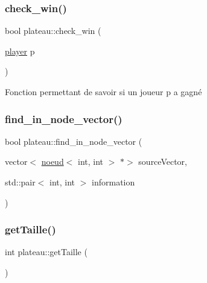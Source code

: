 \subsubsection{\texorpdfstring{check\+\_\+win()}{check\_win()}}
{\footnotesize\ttfamily bool plateau\+::check\+\_\+win (\begin{DoxyParamCaption}\item[{\hyperlink{classplayer}{player}}]{p }\end{DoxyParamCaption})}



Fonction permettant de savoir si un joueur \textquotesingle{}p\textquotesingle{} a gagné 

\mbox{\label{classplateau_a9b9989e2096354655caf666fdc267dc1}} 
\subsubsection{\texorpdfstring{find\+\_\+in\+\_\+node\+\_\+vector()}{find\_in\_node\_vector()}}
{\footnotesize\ttfamily bool plateau\+::find\+\_\+in\+\_\+node\+\_\+vector (\begin{DoxyParamCaption}\item[{vector$<$ \hyperlink{classnoeud}{noeud}$<$ int, int $>$ $\ast$$>$}]{source\+Vector,  }\item[{std\+::pair$<$ int, int $>$}]{information }\end{DoxyParamCaption})}

\mbox{\label{classplateau_a125f7eafbef231cef7db62eb5e2ab94b}} 
\subsubsection{\texorpdfstring{get\+Taille()}{getTaille()}}
{\footnotesize\ttfamily int plateau\+::get\+Taille (\begin{DoxyParamCaption}{ }\end{DoxyParamCaption})\hspace{0.3cm}{\ttfamily [inline]}}

\mbox{\label{classplateau_a45e938ee9402b3d7a0b6eeb4b08557f7}} 

